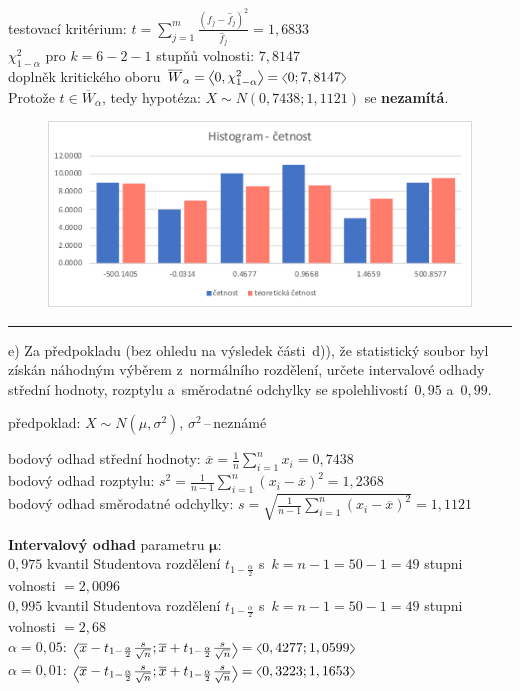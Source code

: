 \documentclass[a4paper, 11pt]{article}
\newcommand{\intlr}[1]{\scaleleftright[1ex]{<}{#1}{>}}
\begin{document}
	testovací kritérium: $ t = \sum\limits_{j = 1}^m
	\frac{(f_j - \hat{f}_j)^2}{\hat{f}_j} = 1,6833 $ \\
	$ \chi_{1 - \alpha}^2 $ pro $ k = 6 - 2 - 1 $ stupňů volnosti:
	$ 7,8147 $ \\
	doplněk kritického oboru $ \overline{W}_\alpha = \intlr{0, \chi_{1 -
	\alpha}^2} = \intlr{0; 7,8147} $ \\
	Protože $ t \in \overline{W}_\alpha $, tedy hypotéza:
	$ X \sim N(0,7438; 1,1121) $ se \textbf{nezamítá}.

	\begin{figure}[H]
		\centering
		\includegraphics[width=.7 \linewidth]{img/1-d-cet.pdf}
	\end{figure}

	\vspace{1em}\noindent\rule{\textwidth}{.5pt}\vspace{1em}

	e) Za předpokladu (bez ohledu na výsledek části~d)), že statistický
	soubor byl získán náhodným výběrem z~normálního rozdělení, určete
	intervalové odhady střední hodnoty, rozptylu a~směrodatné odchylky
	se spolehlivostí~$ 0,95 $ a~$ 0,99 $.
	\vspace{1em}

	předpoklad: $ X \sim N(\mu, \sigma^2) $, $ \sigma^2 $\,--\,neznámé

	bodový odhad střední hodnoty: $ \overline{x} = \frac{1}{n}
	\sum\limits_{i = 1}^n x_i = 0,7438 $ \\
	bodový odhad rozptylu: $ s^2 = \frac{1}{n - 1} \sum\limits_{i = 1}^n
	(x_i - \overline{x})^2 = 1,2368 $ \\
	bodový odhad směrodatné odchylky: $ s = \sqrt{\frac{1}{n - 1}
	\sum\limits_{i = 1}^n (x_i - \overline{x})^2} = 1,1121 $

	\vspace{1em}
	\textbf{Intervalový odhad} parametru $ \boldsymbol{\mu} $: \\
	$ 0,975 $ kvantil Studentova rozdělení $ t_{1 - \frac{\alpha}{2}} $
	s~$ k = n - 1 = 50 - 1 = 49 $ stupni volnosti $ = 2,0096 $ \\
	$ 0,995 $ kvantil Studentova rozdělení $ t_{1 - \frac{\alpha}{2}} $
	s~$ k = n - 1 = 50 - 1 = 49 $ stupni volnosti $ = 2,68 $ \\
	$ \alpha = 0,05 $: $ \intlr{\overline{x} - t_{1 - \frac{\alpha}{2}}
	\frac{s}{\sqrt{n}}; \overline{x} + t_{1 - \frac{\alpha}{2}}
	\frac{s}{\sqrt{n}}} = \intlr{0,4277; 1,0599} $ \\
	$ \alpha = 0,01 $: $ \intlr{\overline{x} - t_{1 - \frac{\alpha}{2}}
	\frac{s}{\sqrt{n}}; \overline{x} + t_{1 - \frac{\alpha}{2}}
	\frac{s}{\sqrt{n}}} = \intlr{0,3223; 1,1653} $
\end{document}
